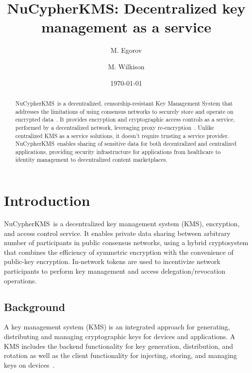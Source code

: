 \documentclass[notitlepage,longbibliography]{revtex4-1}
\newcommand{\kms}{NuCypherKMS}
\begin{document}
\title{\kms: Decentralized key management as a service}

\author{M. Egorov}
\author{M. Wilkison}


\begin{abstract}
    \kms~is a decentralized, censorship-resistant Key Management System that addresses the limitations of using consensus
    networks to securely store and operate on encrypted data~\cite{cryptoeprint:2017:201}.
    It provides encryption and cryptographic access controls as a service, performed by a decentralized network,
    leveraging proxy re-encryption~\cite{wiki:pre}.
    Unlike centralized KMS as a service solutions, it doesn't require trusting a service provider.
    \kms~enables sharing of sensitive data for both decentralized and centralized applications,
    providing security infrastructure for applications from healthcare to identity management to decentralized content marketplaces.
\end{abstract}

\date{\today}
\maketitle

\newpage
\tableofcontents
\newpage

\section{Introduction}

\kms~is a decentralized key management system (KMS), encryption, and access control service.
It enables private data sharing between arbitrary number of participants in public consensus networks,
using a hybrid cryptosystem that combines the efficiency of symmetric encryption with the convenience of public-key encryption.
In-network tokens are used to incentivize network participants to perform key management and access delegation/revocation operations.

\subsection{Background}
A key management system (KMS) is an integrated approach for generating, distributing and managing cryptographic keys for devices and
applications.
A KMS includes the backend functionality for key generation, distribution, and rotation as well as the client functionality for
injecting, storing, and managing keys on devices~\cite{wiki:kms}.
\end{document}
